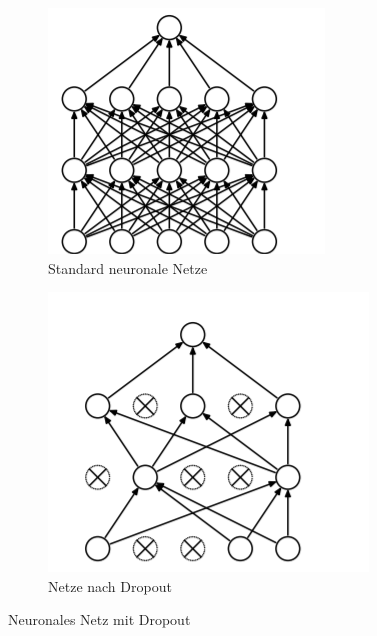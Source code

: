 \documentclass[12pt,a4paper]{scrartcl}
\numberwithin{equation}{section}
\begin{document}
	\begin{figure}[h]
	\begin{subfigure}{.5\textwidth}
		\centering
		\includegraphics[scale=2, width=.8\linewidth, height=\linewidth]{dropout1.png}
			\caption{Standard neuronale Netze}
		\label{fig:dropout1}
	\end{subfigure}%
	\begin{subfigure}{.5\textwidth}
		\centering
		\includegraphics[width=.8\linewidth, height=\linewidth, scale=2]{dropout2.png}
		\caption{Netze nach Dropout}
		\label{fig:dropout2}
	\end{subfigure}
	\caption{Neuronales Netz mit Dropout \cite{3}}
	\label{fig:Dropout}
\end{figure}
\end{document}
